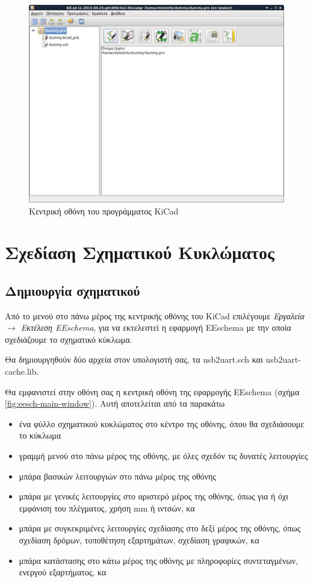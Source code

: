 \documentclass[a4paper]{article}
\begin{document}
\begin{figure}
  \begin{center}
    \includegraphics[width=.9\textwidth]{img/kicad-main-window.png}
    \caption{Κεντρική οθόνη του προγράμματος KiCad}
    \label{fig:kicad-main-window}
  \end{center}
\end{figure}

\newpage
\section{Σχεδίαση Σχηματικού Κυκλώματος}

\subsection{Δημιουργία σχηματικού}
Από το μενού στο πάνω μέρος της κεντρικής οθόνης του \textenglish{KiCad} επιλέγουμε \textit{Εργαλεία $\rightarrow$ Εκτέλεση \textenglish{EEschema}}, για να εκτελεστεί η εφαρμογή \textenglish{EEschema} με την οποία σχεδιάζουμε το σχηματικό κύκλωμα. 

Θα δημιουργηθούν δύο αρχεία στον υπολογιστή σας, τα usb2uart.sch και usb2uart-cache.lib. 

Θα εμφανιστεί στην οθόνη σας η κεντρική οθόνη της εφαρμογής \textenglish{EEschema} (σχήμα \ref{fig:eesch-main-window}). Αυτή αποτελείται από τα παρακάτω
\begin{itemize}
    \item ένα φύλλο σχηματικού κυκλώματος στο κέντρο της οθόνης, όπου θα σχεδιάσουμε το κύκλωμα
    \item γραμμή μενού στο πάνω μέρος της οθόνης, με όλες σχεδόν τις δυνατές λειτουργίες
    \item μπάρα βασικών λειτουργιών στο πάνω μέρος της οθόνης
    \item μπάρα με γενικές λειτουργίες στο αριστερό μέρος της οθόνης, όπως για ή όχι εμφάνιση του πλέγματος, χρήση mm ή ιντσών, κα
    \item μπάρα με συγκεκριμένες λειτουργίες σχεδίασης στο δεξί μέρος της οθόνης, όπως σχεδίαση δρόμων, τοποθέτηση εξαρτημάτων, σχεδίαση γραφικών, κα
    \item μπάρα κατάστασης στο κάτω μέρος της οθόνης με πληροφορίες συντεταγμένων, ενεργού εξαρτήματος, κα
\end{itemize}
\end{document}
